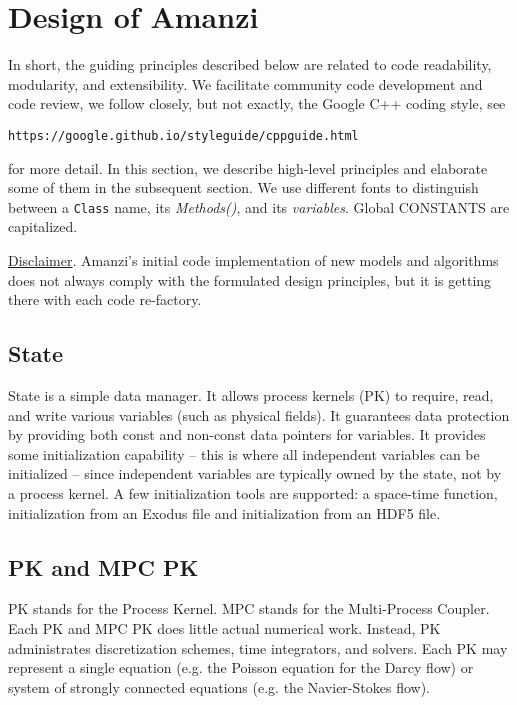 
\section{Design of Amanzi}

In short, the guiding  principles described below are related to code readability,
modularity, and extensibility.
We facilitate community code development and code review, we follow closely, but not exactly, 
the Google C++ coding style, see 
\begin{center}
{\tt https://google.github.io/styleguide/cppguide.html}
\end{center}

for more detail.
In this section, we describe high-level principles and elaborate some of them 
in the subsequent section.
We use different fonts to distinguish between a {\tt Class} name, its {\it Methods()}, 
and its {\it variables}. 
Global {\rm CONSTANTS} are capitalized.

\underline{Disclaimer}. Amanzi's initial code implementation of new models 
and algorithms does not always comply with the formulated design principles, but 
it is getting there with each code re-factory.


\subsection{State}
State is a simple data manager. 
It allows process kernels (PK) to require, read, and write various variables (such as physical fields).
It guarantees data protection by providing both const and non-const data pointers for variables.
It provides some initialization capability -- this is where all independent variables can be 
initialized -- since independent variables are typically owned by the state, not by a process kernel.
A few initialization tools are supported: a space-time function, initialization from an Exodus file 
and initialization from an HDF5 file.



\subsection{PK and MPC PK}
PK stands for the Process Kernel.
MPC stands for the Multi-Process Coupler.
Each PK and MPC PK does little actual numerical work.
Instead, PK administrates discretization schemes, time integrators, and solvers. 
Each PK may represent a single equation (e.g. the Poisson equation for the Darcy flow) 
or system of strongly connected equations (e.g. the Navier-Stokes flow).

